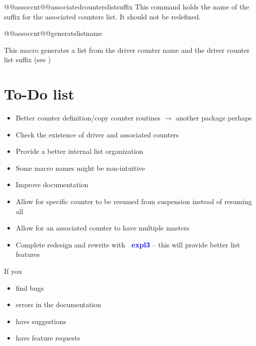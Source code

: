\documentclass[12pt,paper=a4]{article}
\newcommand{\packagename}[1]{\textcolor{blue}{\textbf{\Envelope~#1}}\index{Paket!#1}}%
\begin{document}
\begin{docCommand}{@@assoccnt@@associatedcounterslistsuffix}{}
This command holds the name of the suffix for the associated counters list. It should not be redefined.
\end{docCommand}


\begin{docCommand}{@@assoccnt@@generatelistname}{}

This macro generates a list from the driver counter name and the driver counter list suffix (see )

\makeatletter
\begin{dispExample}
\end{dispExample}
\makeatother

\end{docCommand}


\clearpage

\section{To-Do list}

\begin{itemize}
\item Better counter definition/copy counter routines \(\longrightarrow\) another package perhaps
\item Check the existence of driver and associated counters
\item Provide a better internal list organization
\item Some macro names might be non-intuitive
\item Improve documentation
\item Allow for specific counter to be resumed from suspension instead of resuming all
\item Allow for an associated counter to have multiple masters 
\item Complete redesign and rewrite with \packagename{expl3} -- this will provide better list features
\end{itemize}

If you 

\begin{itemize}
  \item find bugs
  \item errors in the documentation
  \item have suggestions
  \item have feature requests
\end{itemize}
\end{document}
